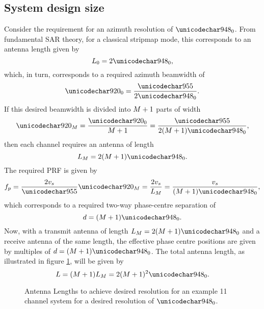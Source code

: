 \subsection{System design size}
Consider the requirement for an azimuth resolution of $\resxDesired$. From fundamental SAR theory, for a classical stripmap mode, this corresponds to an antenna length given by \cite{Cumming2005}
\begin{equation}
 \antennaLengthDesired = 2\resxDesired,
\end{equation}
which, in turn, corresponds to a required azimuth beamwidth of
\begin{equation}
 \threeDBDesired = \frac{\wavelength}{2\resxDesired}.
\end{equation}
If this desired beamwidth is divided into $M + 1$ parts of width
\begin{equation}
 \threeDBEffective = \frac{\threeDBDesired}{\channelM + 1}=\frac{\wavelength}{2(\channelM + 1)\resxDesired},
\end{equation}
then each channel requires an antenna of length
\begin{equation}
 \antennaLengthEffective = 2(\channelM + 1)\resxDesired.
\end{equation}
The required PRF is given by
\begin{equation}
 \prfEffective = \frac{2\satv}{\wavelength}\threeDBEffective = \frac{2\satv}{\antennaLengthEffective} = \frac{\satv}{(\channelM + 1)\resxDesired},
 \label{eq:requiredPRF}
\end{equation}
which corresponds to a required two-way phase-centre separation of
\begin{equation}
 \phaseSep = (\channelM + 1)\resxDesired.
\end{equation}
Now, with a transmit antenna of length $\antennaLengthEffective = 2(\channelM + 1)\resxDesired$ and a receive antenna of the same length, the effective phase centre positions are given by  multiples of $\phaseSep = (\channelM + 1)\resxDesired$. The total antenna length, as illustrated in figure \ref{fg:antennaLenghts}, will be given by
\begin{equation}
 \antennaLength = (\channelM + 1)\antennaLengthEffective = 2(\channelM + 1)^2\resxDesired.
\end{equation}
\begin{figure}[h!]
\begin{center}
 \resizebox{0.5\columnwidth}{!}{}
 \caption{Antenna Lengths to achieve desired resolution for an example 11 channel system for a desired resolution of $\resxDesired$.}
 \label{fg:antennaLenghts}
 \end{center}
\end{figure}
